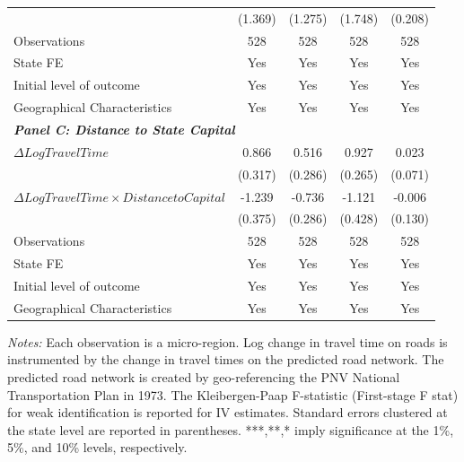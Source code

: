 \begin{table}[p]
{{\begin{tabular}{l*{4}{c}}
&     (1.369)         &     (1.275)         &     (1.748)         &     (0.208)         \\
Observations        &         528         &         528         &         528         &         528         \\
State FE            &         Yes         &         Yes         &         Yes         &         Yes         \\
Initial level of outcome&         Yes         &         Yes         &         Yes         &         Yes         \\
Geographical Characteristics&         Yes         &         Yes         &         Yes         &         Yes         \\
\hline
\multicolumn{4}{l}{\linebreak \textbf{\textit{Panel C: Distance to State Capital}}} \\
$\Delta Log Travel Time$&       0.866\sym{**} &       0.516\sym{*}  &       0.927\sym{***}&       0.023         \\
&     (0.317)         &     (0.286)         &     (0.265)         &     (0.071)         \\
$\Delta Log Travel Time \times Distance to Capital$&      -1.239\sym{***}&      -0.736\sym{**} &      -1.121\sym{**} &      -0.006         \\
&     (0.375)         &     (0.286)         &     (0.428)         &     (0.130)         \\
Observations        &         528         &         528         &         528         &         528         \\
State FE            &         Yes         &         Yes         &         Yes         &         Yes         \\
Initial level of outcome&         Yes         &         Yes         &         Yes         &         Yes         \\
Geographical Characteristics&         Yes         &         Yes         &         Yes         &         Yes         \\
\hline\hline
\end{tabular}}
}
\usebox{\tabbox}
\begin{minipage}{\wd\tabbox}
    \vspace{0.1cm}
    {\footnotesize \sloppy \textit{Notes: } Each observation is a micro-region. Log change in travel time on roads is instrumented by the change in travel times on the predicted road network. The predicted road network is created by geo-referencing the PNV National Transportation Plan in 1973. The Kleibergen-Paap F-statistic (First-stage F stat) for weak identification is reported for IV estimates. Standard errors clustered at the state level are reported in parentheses. ***,**,* imply significance at the 1\%, 5\%, and 10\% levels, respectively.}
\end{minipage}
\endgroup
\end{table}
